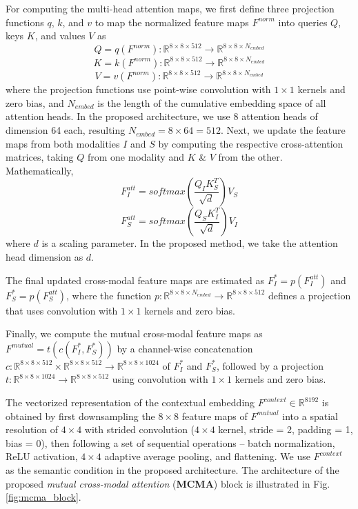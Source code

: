 For computing the multi-head attention maps, we first define three projection functions $q$, $k$, and $v$ to map the normalized feature maps $F^{norm}$ into queries $Q$, keys $K$, and values $V$ as
\[
Q = q(F^{norm}): \mathbb{R}^{8 \times 8 \times 512} \rightarrow \mathbb{R}^{8 \times 8 \times N_{embed}}
\]
\[
K = k(F^{norm}): \mathbb{R}^{8 \times 8 \times 512} \rightarrow \mathbb{R}^{8 \times 8 \times N_{embed}}
\]
\[
V = v(F^{norm}): \mathbb{R}^{8 \times 8 \times 512} \rightarrow \mathbb{R}^{8 \times 8 \times N_{embed}}
\]
where the projection functions use point-wise convolution with $1 \times 1$ kernels and zero bias, and $N_{embed}$ is the length of the cumulative embedding space of all attention heads. In the proposed architecture, we use 8 attention heads of dimension 64 each, resulting $N_{embed} = 8 \times 64 = 512$. Next, we update the feature maps from both modalities $I$ and $S$ by computing the respective cross-attention matrices, taking $Q$ from one modality and $K$ \& $V$ from the other. Mathematically,
\[
F^{att}_I = softmax \left( \frac{Q_I K^T_S}{\sqrt{d}} \right) V_S
\]
\[
F^{att}_S = softmax \left( \frac{Q_S K^T_I}{\sqrt{d}} \right) V_I
\]
where $d$ is a scaling parameter. In the proposed method, we take the attention head dimension as $d$.

The final updated cross-modal feature maps are estimated as $F^*_I = p(F^{att}_I)$ and $F^*_S = p(F^{att}_S)$, where the function $p: \mathbb{R}^{8 \times 8 \times N_{embed}} \rightarrow \mathbb{R}^{8 \times 8 \times 512}$ defines a projection that uses convolution with $1 \times 1$ kernels and zero bias.

Finally, we compute the mutual cross-modal feature maps as $F^{mutual} = t(c(F^*_I, F^*_S))$ by a channel-wise concatenation $c: \mathbb{R}^{8 \times 8 \times 512} \times \mathbb{R}^{8 \times 8 \times 512} \rightarrow \mathbb{R}^{8 \times 8 \times 1024}$ of $F^*_I$ and $F^*_S$, followed by a projection $t: \mathbb{R}^{8 \times 8 \times 1024} \rightarrow \mathbb{R}^{8 \times 8 \times 512}$ using convolution with $1 \times 1$ kernels and zero bias.

The vectorized representation of the contextual embedding $F^{context} \in \mathbb{R}^{8192}$ is obtained by first downsampling the $8 \times 8$ feature maps of $F^{mutual}$ into a spatial resolution of $4 \times 4$ with strided convolution ($4 \times 4$ kernel, stride = 2, padding = 1, bias = 0), then following a set of sequential operations -- batch normalization, ReLU activation, $4 \times 4$ adaptive average pooling, and flattening. We use $F^{context}$ as the semantic condition in the proposed architecture. The architecture of the proposed \emph{mutual cross-modal attention} (\textbf{MCMA}) block is illustrated in Fig. \ref{fig:mcma_block}.

